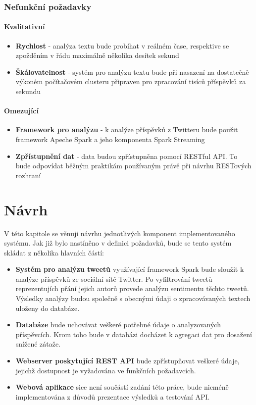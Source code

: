 \documentclass[thesis=B,czech]{FITthesis}[2012/06/26]
\begin{document}
\subsection{Nefunkční požadavky}
\subsubsection{Kvalitativní}
\begin{itemize}
\item \textbf{Rychlost} - analýza textu bude probíhat v reálném čase, respektive se zpožděním v řádu maximálně několika desítek sekund
\item \textbf{Škálovatelnost} - systém pro analýzu textu bude při nasazení na dostatečně výkoném počítačovém clusteru připraven pro zpracování tisíců příspěvků za sekundu
\end{itemize}
\subsubsection{Omezující}
\begin{itemize}
\item \textbf{Framework pro analýzu} - k analýze příspěvků z Twitteru bude použit framework Apeche Spark a jeho komponenta Spark Streaming
\item \textbf{Zpřístupnění dat} - data budou zpřístupněna pomocí RESTful API. To bude odpovídat běžným praktikám používaným právě při návrhu RESTových rozhraní
\end{itemize}


\chapter{Návrh}
\label{navrh}
V této kapitole se věnuji návrhu jednotlivých komponent implementovaného systému. Jak již bylo nastíněno v definici požadavků, bude se tento systém skládat z několika hlavních částí: 
\begin{itemize}
\item \textbf{Systém pro analýzu tweetů} využívající framework Spark bude sloužit k analýze příspěvků ze sociální sítě Twitter. Po vyfiltrování tweetů reprezentujích přání jejich autorů provede analýzu sentimentu těchto tweetů. Výsledky analýzy budou společně s obecnými údaji o zpracovávaných textech uloženy do databáze. 
\item \textbf{Databáze} bude uchovávat veškeré potřebné údaje o analyzovaných příspěvcích. Krom toho bude v databázi docházet k agregaci dat pro dosažení snížené zátaže. 
\item \textbf{Webserver poskytující REST API} bude zpřístupňovat veškeré údaje, jejichž dostupnost je vyžadována ve funkčních požadavcích. 
\item \textbf{Webová aplikace} sice není součástí zadání této práce, bude nicméně implementována z důvodů prezentace výsledků a testování API. 
\end{itemize}
\end{document}
